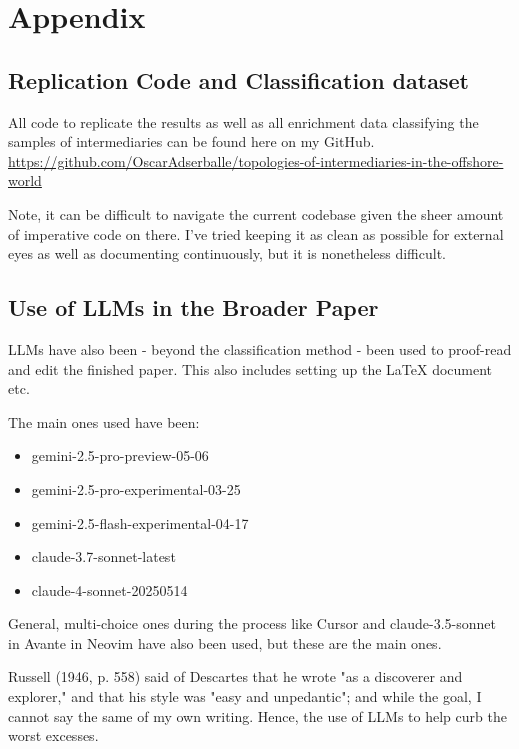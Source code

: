 \chapter{Appendix}
\label{chap:appendix}

\section{Replication Code and Classification dataset}

All code to replicate the results as well as all enrichment data classifying the samples of intermediaries can be found here on my GitHub. \href{https://github.com/OscarAdserballe/topologies-of-intermediaries-in-the-offshore-world}{https://github.com/OscarAdserballe/topologies-of-intermediaries-in-the-offshore-world}

Note, it can be difficult to navigate the current codebase given the sheer amount of imperative code on there. I've tried keeping it as clean as possible for external eyes as well as documenting continuously, but it is nonetheless difficult.

\newpage

\section{Use of LLMs in the Broader Paper}

LLMs have also been - beyond the classification method - been used to proof-read and edit the finished paper. This also includes setting up the LaTeX document etc. 

The main ones used have been:

\begin{itemize}
    \item gemini-2.5-pro-preview-05-06
    \item gemini-2.5-pro-experimental-03-25
    \item gemini-2.5-flash-experimental-04-17
    \item claude-3.7-sonnet-latest
    \item claude-4-sonnet-20250514
\end{itemize}

General, multi-choice ones during the process like Cursor and claude-3.5-sonnet in Avante in Neovim have also been used, but these are the main ones.

Russell (1946, p. 558) said of Descartes that he wrote "as a discoverer and explorer," and that his style was "easy and unpedantic"; and while the goal, I cannot say the same of my own writing. Hence, the use of LLMs to help curb the worst excesses. 

